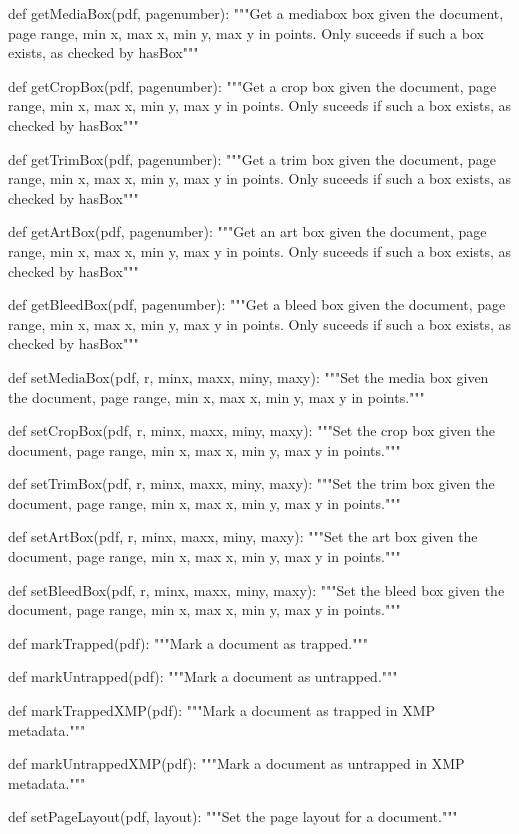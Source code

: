def getMediaBox(pdf, pagenumber):
    """Get a mediabox box given the document, page range, min x, max x,
    min y, max y in points. Only suceeds if such a box exists, as checked by
    hasBox"""

def getCropBox(pdf, pagenumber):
    """Get a crop box given the document, page range, min x, max x,
    min y, max y in points. Only suceeds if such a box exists, as checked by
    hasBox"""

def getTrimBox(pdf, pagenumber):
    """Get a trim box given the document, page range, min x, max x,
    min y, max y in points. Only suceeds if such a box exists, as checked by
    hasBox"""

def getArtBox(pdf, pagenumber):
    """Get an art box given the document, page range, min x, max x,
    min y, max y in points. Only suceeds if such a box exists, as checked by
    hasBox"""

def getBleedBox(pdf, pagenumber):
    """Get a bleed box given the document, page range, min x, max x,
    min y, max y in points. Only suceeds if such a box exists, as checked by
    hasBox"""

def setMediaBox(pdf, r, minx, maxx, miny, maxy):
    """Set the media box given the document, page range, min x, max x,
    min y, max y in points."""

def setCropBox(pdf, r, minx, maxx, miny, maxy):
    """Set the crop box given the document, page range, min x, max x,
    min y, max y in points."""

def setTrimBox(pdf, r, minx, maxx, miny, maxy):
    """Set the trim box given the document, page range, min x, max x,
    min y, max y in points."""

def setArtBox(pdf, r, minx, maxx, miny, maxy):
    """Set the art box given the document, page range, min x, max x,
    min y, max y in points."""

def setBleedBox(pdf, r, minx, maxx, miny, maxy):
    """Set the bleed box given the document, page range, min x, max x,
    min y, max y in points."""

def markTrapped(pdf):
    """Mark a document as trapped."""

def markUntrapped(pdf):
    """Mark a document as untrapped."""

def markTrappedXMP(pdf):
    """Mark a document as trapped in XMP metadata."""

def markUntrappedXMP(pdf):
    """Mark a document as untrapped in XMP metadata."""

def setPageLayout(pdf, layout):
    """Set the page layout for a document."""

